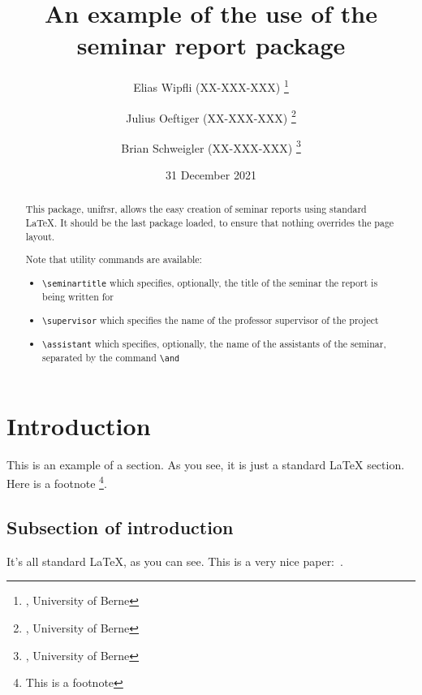 \documentclass[a4paper,12pt]{article}
\begin{document}

\title{An example of the use of the seminar report package} %

\author{
   Elias Wipfli (XX-XXX-XXX) 
   \thanks{, University of Berne}
   \and
   Julius Oeftiger (XX-XXX-XXX) 
   \thanks{, University of Berne}
   \and
   Brian Schweigler (XX-XXX-XXX)
   \thanks{, University of Berne}
}



\date{31 December 2021} %

\maketitle

\begin{abstract}
This package, \textsf{unifrsr}, allows the easy creation of seminar
reports using standard \LaTeX. It should be the last
package loaded, to ensure that nothing overrides the page layout.

Note that utility commands are available: 
\begin{itemize}
\item \verb+\seminartitle+ which specifies, optionally, the title of the seminar the report is being written for
\item \verb+\supervisor+ which specifies the name of the professor supervisor of the project
\item \verb+\assistant+ which specifies, optionally, the name of the assistants of the seminar, separated by the command \verb+\and+
\end{itemize}


\end{abstract}

\tableofcontents
\newpage

\section{Introduction}
This is an example of a section. As you see, it is just a standard
{\LaTeX} section. Here is a footnote%
\footnote{This is a footnote}.

\subsection{Subsection of introduction}
It's all standard \LaTeX, as you can see.
This is a very nice paper:~\cite{zadeh}.



\end{document}
